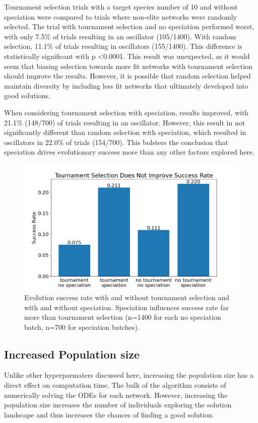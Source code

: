 \documentclass[12pt]{report}
\begin{document}
Tournament selection trials with a target species number of 10 and without speciation were compared to trials where non-elite networks were randomly selected. The trial with tournament selection and no speciation performed worst, with only 7.5\% of trials resulting in an oscillator (105/1400). With random selection, 11.1\% of trials resulting in oscillators (155/1400). This difference is statistically significant with p \textless 0.0001. This result was unexpected, as it would seem that biasing selection towards more fit networks with tournament selection should improve the results. However, it is possible that random selection helped maintain diversity by including less fit networks that ultimately developed into good solutions.

When considering tournament selection with speciation, results improved, with 21.1\% (148/700) of trials resulting in an oscillator. However, this result in not significantly different than random selection with speciation, which resulted in oscillators in 22.0\% of trials (154/700). This bolsters the conclusion that speciation drives evolutionary success more than any other factors explored here.

\begin{figure}
	\centering
    \includegraphics[width=15cm]{images/tournament_speciation.png}
    \caption[Evolutionary success rates with tournament selection and speciation]{Evolution success rate with and without tournament selection and with and without speciation. Speciation influences success rate far more than tournament selection (n=1400 for each no speciation batch, n=700 for speciation batches).}
    \label{fig:elitism_success}
\end{figure}

\subsection{Increased Population size}
Unlike other hyperparmaters discussed here, increasing the population size has a direct effect on computation time. The bulk of the algorithm consists of numerically solving the ODEs for each network. However, increasing the population size increases the number of individuals exploring the solution landscape and thus increases the chances of finding a good solution. 
\end{document}
